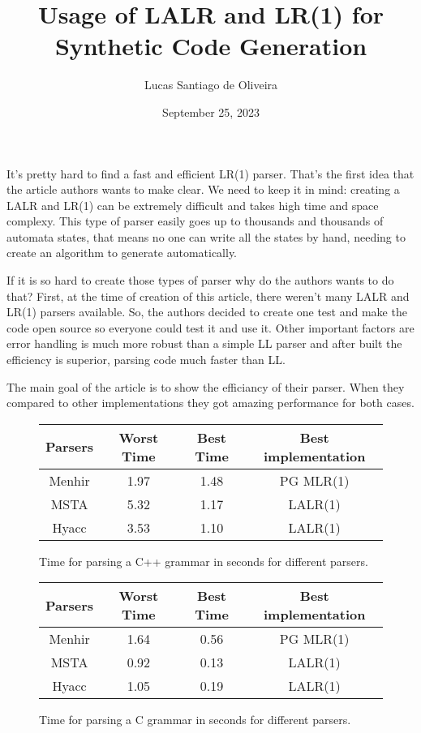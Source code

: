 \documentclass{article}
\title{Usage of LALR and LR(1) for Synthetic Code Generation}
\author{Lucas Santiago de Oliveira}
\date{September 25, 2023}
\begin{document}
    \maketitle

    It's pretty hard to find a fast and efficient LR(1) parser. That's the first idea that
    the article authors wants to make clear. We need to keep it in mind: creating a LALR and LR(1) can be extremely
    difficult and takes high time and space complexy. This type of parser easily goes up to thousands and thousands of automata states, that
    means no one can write all the states by hand, needing to create an algorithm to generate automatically.

    If it is so hard to create those types of parser why do the authors wants to do that? First, at the time of
    creation of this article\cite{hyacc}, there weren't many LALR and LR(1) parsers available. So,
    the authors decided to create one test and make the code open source so everyone could test it and use it.
    Other important factors are error handling is much more robust than a simple LL parser and after built the efficiency
    is superior, parsing code much faster than LL.

    The main goal of the article is to show the efficiancy of their parser. When they compared to other
    implementations they got amazing performance for both cases.

    \begin{figure}[h!]
        \centering
        \begin{tabular}{|c|c|c|c|}
            \hline
            Parsers & Worst Time & Best Time & Best implementation \\
            \hline
            Menhir & 1.97 & 1.48 & PG MLR(1) \\
            \hline
            MSTA & 5.32 & 1.17 & LALR(1) \\
            \hline
            Hyacc & 3.53 & 1.10 & LALR(1) \\
            \hline
        \end{tabular}
        \caption{Time for parsing a C++ grammar in seconds for different parsers.}
    \end{figure}

    \begin{figure}[h!]
        \centering
        \begin{tabular}{|c|c|c|c|}
            \hline
            Parsers & Worst Time & Best Time & Best implementation \\
            \hline
            Menhir & 1.64 & 0.56 & PG MLR(1) \\
            \hline
            MSTA & 0.92 & 0.13 & LALR(1) \\
            \hline
            Hyacc & 1.05 & 0.19 & LALR(1) \\
            \hline
        \end{tabular}
        \caption{Time for parsing a C grammar in seconds for different parsers.}
    \end{figure}
\end{document}
